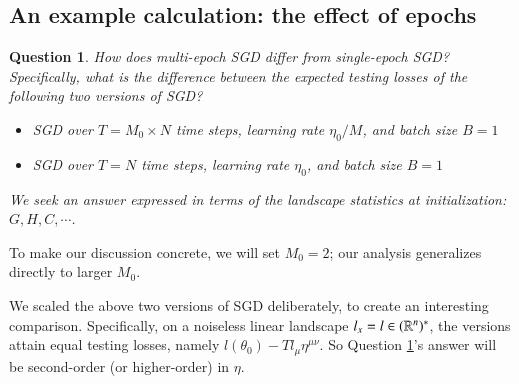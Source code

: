 \documentclass[anon,12pt]{colt2021} %
\newtheorem{quest}{Question}
\begin{document}
    \subsection{An example calculation: the effect of epochs}       \label{appendix:example}

        \begin{quest}\label{qst:multi}
            How does multi-epoch SGD differ from single-epoch SGD?
            Specifically, what is the difference between the expected
            testing losses of the following two versions of SGD?
            \begin{itemize}
                \item SGD over $T=M_0 \times N$ time steps, learning rate $\eta_0/M$, and
                    batch size $B=1$
                \item SGD over $T=N$ time steps, learning rate $\eta_0$, and batch size $B=1$
            \end{itemize}
            We seek an answer expressed in terms of the landscape statistics
            at initialization: $G,H,C, \cdots$.
        \end{quest}
        To make our discussion concrete, we will set $M_0=2$; our analysis 
        generalizes directly to larger $M_0$.

        We scaled the above two versions of SGD deliberately, to create an
        interesting comparison.
        Specifically, on a noiseless
        linear landscape $l_x=l \in (\mathbb{R}^n)^*$, the versions
        attain equal testing losses, namely $l(\theta_0) - T l_\mu \eta^{\mu\nu}$.
        So Question \ref{qst:multi}'s answer will be second-order (or
        higher-order) in $\eta$.
\end{document}
